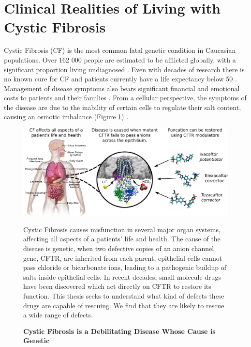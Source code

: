 

\section{Clinical Realities of Living with Cystic Fibrosis}
Cystic Fibrosis (CF) is the most common fatal genetic condition in Caucasian populations. Over 162 000 people are estimated to be afflicted globally, with a significant proportion living undiagnosed \cite{hammoudeh2021,guo2022}. Even with decades of research there is no known cure for CF and patients currently have a life expectancy below 50 \cite{mcbennett2022}. Management of disease symptoms also bears significant financial and emotional costs to patients and their families \cite{vangool2013, page2022}. From a cellular perspective, the symptoms of the disease are due to the inability of certain cells to regulate their salt content, causing an osmotic imbalance (Figure \ref{CF_summary}) \cite{reddy2013}. 

\begin{figure}
	\label{CF_summary}
	\begin{center}
	\includegraphics[width=1\textwidth]{figures/cf_summary_fig.pdf}
	\end{center}
	\captionsetup{singlelinecheck = false, justification=raggedright}
	\caption[Cystic Fibrosis is a Debilitating Disease Whose Cause is Genetic] {\textbf{Cystic Fibrosis is a Debilitating Disease Whose Cause is Genetic}}{Cystic Fibrosis causes misfunction in several major organ systems, affecting all aspects of a patients' life and health. The cause of the disease is genetic, when two defective copies of an anion channel gene, CFTR, are inherited from each parent, epithelial cells cannot pass chloride or bicarbonate ions, leading to a pathogenic buildup of salts inside epithelial cells. In recent decades, small molecule drugs have been discovered which act directly on CFTR to restore its function. This thesis seeks to understand what kind of defects these drugs are capable of rescuing. We find that they are likely to rescue a wide range of defects.} 
\end{figure}

